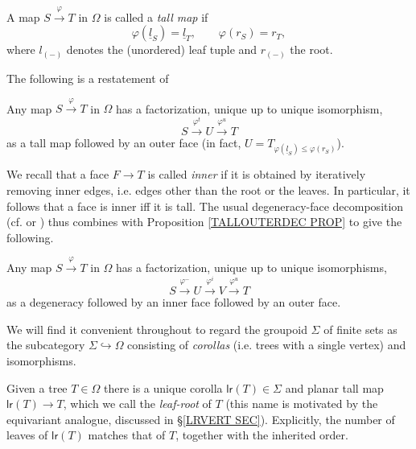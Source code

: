 \documentclass[a4paper,10pt]{article}%
\begin{document}
 
\begin{definition}
	A map $S \xrightarrow{\varphi} T$ in $\Omega$ is called a \textit{tall map} if 
	\[\varphi(\underline{l}_S) = \underline{l}_T, 
		\qquad
	\varphi(r_S)= r_T,\]
where $l_{(\minus)}$ denotes the (unordered) leaf tuple and $r_{(\minus)}$ the root.
\end{definition}


The following is a restatement of \cite[Cor. 5.24]{Pe17}

\begin{proposition}\label{TALLOUTERDEC PROP}
	Any map $S \xrightarrow{\varphi} T$ in $\Omega$ has a factorization, unique up to unique isomorphism,
	\[
		S \xrightarrow{\varphi^t} U \xrightarrow{\varphi^u} T
	\]
	as a tall map followed by an outer face (in fact, 
	$U= T_{\varphi(\underline{l}_S) \leq \varphi(r_S)}$).
\end{proposition}

We recall that a face $F \to T$ is called \textit{inner} if it is obtained by iteratively removing inner edges, i.e. edges other than the root or the leaves. In particular, it follows that a face is inner iff it is tall. The usual degeneracy-face decomposition
(cf. \cite[Lemma 3.1]{MW07} or \cite[Prop. 5.37]{Pe17})
thus combines with Proposition \ref{TALLOUTERDEC PROP} to give the following.


\begin{corollary}
	Any map $S \xrightarrow{\varphi} T$ in $\Omega$ has a factorization, unique up to unique isomorphisms,
\[
	S \xrightarrow{\varphi^-} U
	\xrightarrow{\varphi^i} V
	\xrightarrow{\varphi^u} T
\]
	as a degeneracy followed by an inner face followed by an outer face.
\end{corollary}
	


We will find it convenient  throughout to regard the 
groupoid $\Sigma$ of finite sets 
as the subcategory 
$\Sigma \hookrightarrow \Omega$
consisting of \textit{corollas}
(i.e. trees with a single vertex)
and isomorphisms.


\begin{notation}\label{UNIQCOR NOT}
	Given a tree $T \in \Omega$ there is a unique corolla $\mathsf{lr}(T) \in \Sigma$ and planar tall map 
	$\mathsf{lr}(T) \to T$, which we call the 
	\textit{leaf-root} of $T$ (this name is motivated by the equivariant analogue, discussed in \S \ref{LRVERT SEC}).
	Explicitly, the number of leaves of $\mathsf{lr}(T)$ matches that of $T$, together with the inherited order. 
\end{notation}
\end{document}

